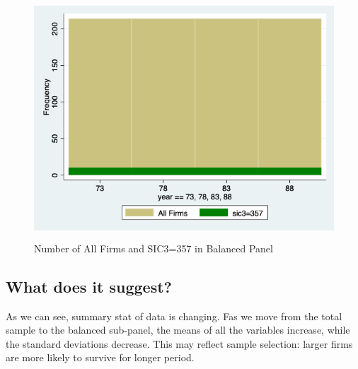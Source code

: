 \begin{figure}[h]
    \centering
    \includegraphics[height=9cm]{HW1/LATEX/Attachments/q1_balanced.png}
    \caption{Number of All Firms and SIC3=357 in Balanced Panel}
    \label{fig:my_label}
\end{figure}



\subsection{What does it suggest?}
As we can see, summary stat of data is changing. Fas we move from the total sample to the balanced sub-panel, the means of all the variables increase, while the standard deviations decrease. This may reflect sample selection: larger firms are more likely to survive for longer period.